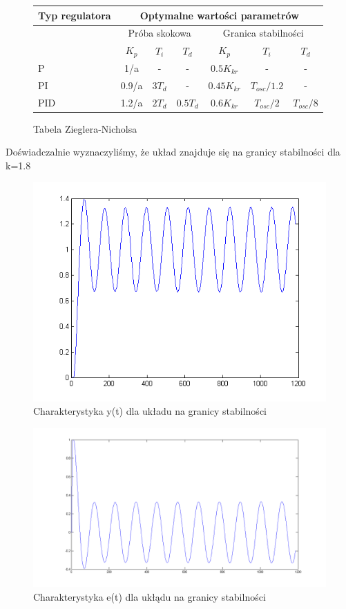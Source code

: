 \documentclass[a4paper,10pt]{article}
\begin{document}
\begin{figure}[!h]
\begin{tabular}{ | l | c | c | c | c | c | c | }
\hline
  Typ regulatora & \multicolumn{6}{|c|}{Optymalne wartości parametrów} \\   \hline
   & \multicolumn{3}{|c|}{Próba skokowa} & \multicolumn{3}{|c|}{Granica stabilności} \\   \hline
   & $K_{p}$ & $T_{i}$ & $T_{d}$ & $K_{p}$ & $T_{i}$ & $T_{d}$\\   \hline
   P & 1/a & - & - & $0.5K_{kr}$ & - & - \\   \hline
   PI & 0.9/a & $3 T_{d}$ & - & $0.45K_{kr}$ & $T_{osc}/1.2$ & - \\   \hline
   PID & 1.2/a & $2T_{d}$ & $0.5T_d$ & $0.6K_{kr}$ & $T_{osc}/2$ & $T_{osc}/8$ \\   \hline
\hline
\end{tabular}
	\caption{Tabela Zieglera-Nicholsa}
\end{figure}

Doświadczalnie wyznaczyliśmy, że układ znajduje się na granicy stabilności dla k=1.8 
\begin{figure}[htbp]
    \centering
	\includegraphics[width=130mm]{CW2-Z3-y2.png}
	\caption{Charakterystyka y(t) dla układu na granicy stabilności}
    \label{fig:z3-fy2}
\end{figure}
\begin{figure}[htbp]
    \centering
	\includegraphics[width=130mm]{CW2-Z3-e2.png}
	\caption{Charakterystyka e(t) dla ukłądu na granicy stabilności}
    \label{fig:z3-fe2}
\end{figure}
\end{document}
